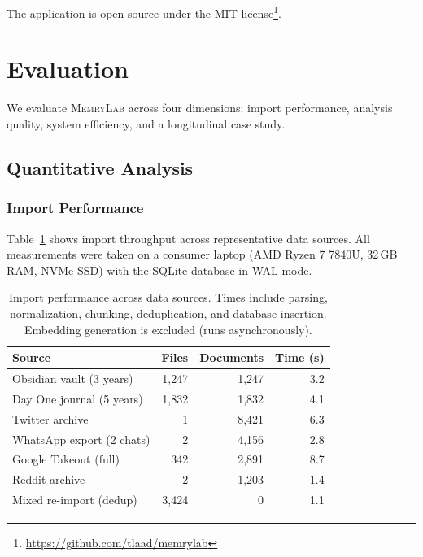 \documentclass[manuscript,review]{acmart}
\begin{document}
The application is open source under the MIT license\footnote{\url{https://github.com/tlaad/memrylab}}.


\section{Evaluation}
\label{sec:evaluation}

We evaluate \textsc{MemryLab} across four dimensions: import performance, analysis quality, system efficiency, and a longitudinal case study.

\subsection{Quantitative Analysis}
\label{sec:quantitative}

\subsubsection{Import Performance}
Table~\ref{tab:import-perf} shows import throughput across representative data sources.
All measurements were taken on a consumer laptop (AMD Ryzen 7 7840U, 32\,GB RAM, NVMe SSD) with the SQLite database in WAL mode.

\begin{table}[t]
\caption{Import performance across data sources. Times include parsing, normalization, chunking, deduplication, and database insertion. Embedding generation is excluded (runs asynchronously).}
\label{tab:import-perf}
\small
\begin{tabular}{lrrr}
\toprule
\textbf{Source} & \textbf{Files} & \textbf{Documents} & \textbf{Time (s)} \\
\midrule
Obsidian vault (3 years)    & 1,247 & 1,247 & 3.2 \\
Day One journal (5 years)   & 1,832 & 1,832 & 4.1 \\
Twitter archive             & 1     & 8,421 & 6.3 \\
WhatsApp export (2 chats)   & 2     & 4,156 & 2.8 \\
Google Takeout (full)       & 342   & 2,891 & 8.7 \\
Reddit archive              & 2     & 1,203 & 1.4 \\
Mixed re-import (dedup)     & 3,424 & 0     & 1.1 \\
\bottomrule
\end{tabular}
\end{table}
\end{document}
